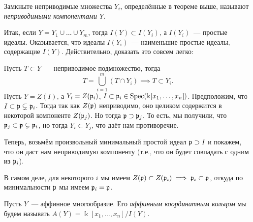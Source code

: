	\begin{definition} 
		Замкныте неприводимые множества $Y_i$, определённые в теореме выше, называют \emph{неприводимыми компонентами $Y$}.
	\end{definition}

	Итак, если $Y = Y_1 \cup \ldots \cup Y_m$, тогда $I(Y) \subset I(Y_i)$, а $I(Y_i)$~--- простые идеалы. Оказывается, что идеалы $I(Y_i)$~--- наименьшие простые идеалы, содержащие $I(Y)$. Действительно, доказать это совсем легко: 

	Пусть $T \subset Y$~--- неприводимое подмножество, тогда
	\[
		T = \bigcup_{i = 1}^{m}(T \cap Y_i) \implies T \subset Y_i.
	\]
	Пусть $Y = Z(I)$, а $Y_i = Z(\mathfrak{p}_i)$, $I \subset \mathfrak{p}_i \in \operatorname{Spec}(\Bbbk[x_1, \ldots, x_n])$. Предположим, что $I \subset \mathfrak{p} \subsetneq \mathfrak{p}_i$. Тогда так как $Z(\mathfrak{p})$ неприводимо, оно целиком содержится в некоторой компоненте $Z(\mathfrak{p}_j)$. Но тогда $\mathfrak{p} \supset \mathfrak{p}_j$. То есть, мы получили, что $\mathfrak{p}_j \subset \mathfrak{p} \subsetneq \mathfrak{p}_i$, но тогда $Y_i \subset Y_j$, что даёт нам противоречие. 

	Теперь, возьмём произвольный минимальный простой идеал $\mathfrak{p} \supset I$ и покажем, что он даст нам неприводимую компоненту (т.е., что он будет совпадать с одним из $\mathfrak{p}_i$). 

	В самом деле, для некоторого $i$ мы имеем $Z(\mathfrak{p}) \subset Z(\mathfrak{p}_i) \implies \mathfrak{p}_i \subset \mathfrak{p}$, откуда по минимальности $\mathfrak{p}$ мы имеем $\mathfrak{p}_i = \mathfrak{p}$.

	\begin{definition} 
		Пусть $Y$~--- аффинное многообразие. Его \emph{аффинным координатным кольцом} мы будем называть $A(Y) = \Bbbk[x_1, \ldots, x_n]/I(Y)$.
	\end{definition}


